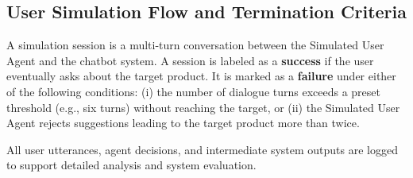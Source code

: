 \subsection{User Simulation Flow and Termination Criteria}

A simulation session is a multi-turn conversation between the Simulated User Agent and the chatbot system. %
A session is labeled as a \textbf{success} if the user eventually asks about the target product. It is marked as a \textbf{failure} under either of the following conditions: (i) the number of dialogue turns exceeds a preset threshold (e.g., six turns) without reaching the target, or (ii) the Simulated User Agent rejects suggestions leading to the target product more than twice.

All user utterances, agent decisions, and intermediate system outputs are logged to support detailed analysis and system evaluation.




